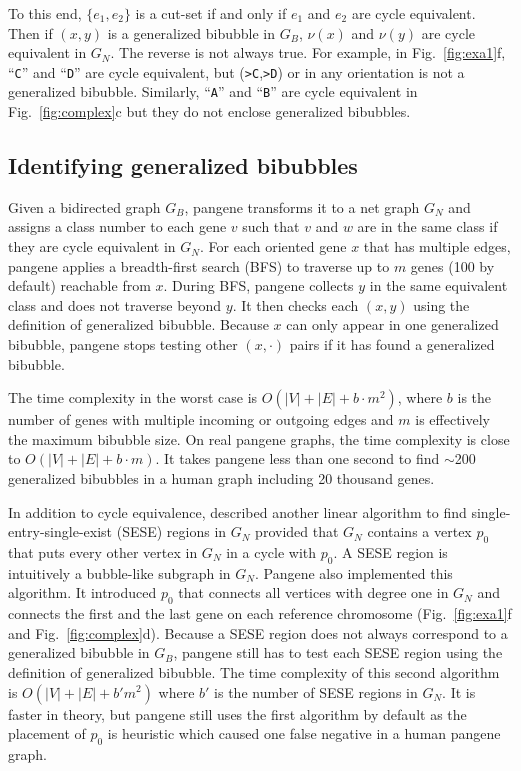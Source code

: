 \documentclass[webpdf,contemporary,large,namedate]{oup-authoring-template}%
\begin{document}
To this end, $\{e_1,e_2\}$ is a cut-set if and only if $e_1$ and $e_2$ are cycle equivalent.
Then if $(x,y)$ is a generalized bibubble in $G_B$,
$\nu(x)$ and $\nu(y)$ are cycle equivalent in $G_N$.
The reverse is not always true.
For example, in Fig.~\ref{fig:exa1}f, ``{\tt C}'' and ``{\tt D}'' are cycle equivalent,
but ({\tt >C},{\tt >D}) or in any orientation is not a generalized bibubble.
Similarly, ``{\tt A}'' and ``{\tt B}'' are cycle equivalent in Fig.~\ref{fig:complex}c but they do not enclose generalized bibubbles.


\subsection{Identifying generalized bibubbles}

Given a bidirected graph $G_B$, pangene transforms it to a net graph $G_N$
and assigns a class number to each gene $v$ such that $v$ and $w$ are in the same class if they are cycle equivalent in $G_N$.
For each oriented gene $x$ that has multiple edges,
pangene applies a breadth-first search (BFS) to traverse up to $m$ genes (100 by default) reachable from $x$.
During BFS, pangene collects $y$ in the same equivalent class and does not traverse beyond $y$.
It then checks each $(x,y)$ using the definition of generalized bibubble.
Because $x$ can only appear in one generalized bibubble, pangene stops testing other $(x,\cdot)$ pairs
if it has found a generalized bibubble.

The time complexity in the worst case is $O(|V|+|E|+b\cdot m^2)$, where $b$ is the number of genes with multiple incoming or outgoing edges
and $m$ is effectively the maximum bibubble size.
On real pangene graphs, the time complexity is close to $O(|V|+|E|+b\cdot m)$.
It takes pangene less than one second to find $\sim$200 generalized bibubbles
in a human graph including 20 thousand genes.

In addition to cycle equivalence, \citet{DBLP:conf/pldi/JohnsonPP94}
described another linear algorithm to find single-entry-single-exist (SESE) regions in $G_N$
provided that $G_N$ contains a vertex $p_0$ that puts every other vertex in $G_N$ in a cycle with $p_0$.
A SESE region is intuitively a bubble-like subgraph in $G_N$.
Pangene also implemented this algorithm.
It introduced $p_0$ that connects all vertices with degree one in $G_N$
and connects the first and the last gene on each reference chromosome (Fig.~\ref{fig:exa1}f and Fig.~\ref{fig:complex}d).
Because a SESE region does not always correspond to a generalized bibubble in $G_B$,
pangene still has to test each SESE region using the definition of generalized bibubble.
The time complexity of this second algorithm is $O(|V|+|E|+b'm^2)$ where $b'$ is the number of
SESE regions in $G_N$.
It is faster in theory,
but pangene still uses the first algorithm by default
as the placement of $p_0$ is heuristic which caused one false negative in a human pangene graph.
\end{document}
